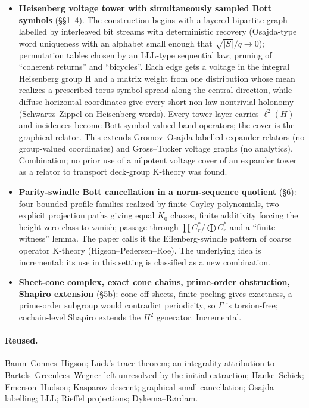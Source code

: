 \documentclass[11pt]{article}
\begin{document}
\begin{itemize}
\item \textbf{Heisenberg voltage tower with simultaneously sampled Bott symbols} (\S{}\S{}1--4). The construction begins with a layered bipartite graph labelled by interleaved bit streams with deterministic recovery (Osajda-type word uniqueness with an alphabet small enough that $\sqrt{|S|}/q\to0$); permutation tables chosen by an LLL-type sequential law; pruning of ``coherent returns'' and ``bicycles''. Each edge gets a voltage in the integral Heisenberg group H and a matrix weight from one distribution whose mean realizes a prescribed torus symbol spread along the central direction, while diffuse horizontal coordinates give every short non-law nontrivial holonomy (Schwartz--Zippel on Heisenberg words). Every tower layer carries $\ell^2(H)$ and incidences become Bott-symbol-valued band operators; the cover is the graphical relator. This extends Gromov--Osajda labelled-expander relators (no group-valued coordinates) and Gross--Tucker voltage graphs (no analytics). Combination; no prior use of a nilpotent voltage cover of an expander tower as a relator to transport deck-group K-theory was found.
\item \textbf{Parity-swindle Bott cancellation in a norm-sequence quotient} (\S{}6): four bounded profile families realized by finite Cayley polynomials, two explicit projection paths giving equal $K_{0}$ classes, finite additivity forcing the height-zero class to vanish; passage through $\prod C^*_r/\bigoplus C^*_r$ and a ``finite witness'' lemma. The paper calls it the Eilenberg-swindle pattern of coarse operator K-theory (Higson--Pedersen--Roe). The underlying idea is incremental; its use in this setting is classified as a new combination.
\item \textbf{Sheet-cone complex, exact cone chains, prime-order obstruction, Shapiro extension} (\S{}5b): cone off sheets, finite peeling gives exactness, a prime-order subgroup would contradict periodicity, so $\Gamma$ is torsion-free; cochain-level Shapiro extends the $H^{2}$ generator. Incremental.
\end{itemize}

\paragraph{Reused.}

Baum--Connes--Higson; Lück's trace theorem; an integrality attribution to Bartels--Greenlees--Wegner left unresolved by the initial extraction; Hanke--Schick; Emerson--Hudson; Kasparov descent; graphical small cancellation; Osajda labelling; LLL; Rieffel projections; Dykema--Rørdam.
\end{document}
